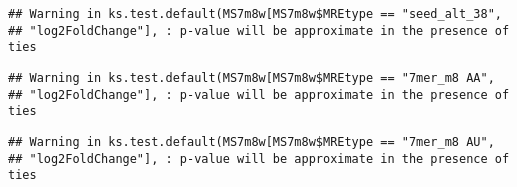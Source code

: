 \documentclass[
]{article}
\newenvironment{Shaded}{\begin{snugshade}}{\end{snugshade}}
\newcommand{\FunctionTok}[1]{\textcolor[rgb]{0.13,0.29,0.53}{\textbf{#1}}}
\newcommand{\NormalTok}[1]{#1}
\newcommand{\OtherTok}[1]{\textcolor[rgb]{0.56,0.35,0.01}{#1}}
\newcommand{\SpecialCharTok}[1]{\textcolor[rgb]{0.81,0.36,0.00}{\textbf{#1}}}
\newcommand{\StringTok}[1]{\textcolor[rgb]{0.31,0.60,0.02}{#1}}
\begin{document}
\begin{verbatim}
## Warning in ks.test.default(MS7m8w[MS7m8w$MREtype == "seed_alt_38",
## "log2FoldChange"], : p-value will be approximate in the presence of ties
\end{verbatim}

\begin{Shaded}
\end{Shaded}

\begin{verbatim}
## Warning in ks.test.default(MS7m8w[MS7m8w$MREtype == "7mer_m8 AA",
## "log2FoldChange"], : p-value will be approximate in the presence of ties
\end{verbatim}

\begin{Shaded}
\end{Shaded}

\begin{verbatim}
## Warning in ks.test.default(MS7m8w[MS7m8w$MREtype == "7mer_m8 AU",
## "log2FoldChange"], : p-value will be approximate in the presence of ties
\end{verbatim}
\end{document}
